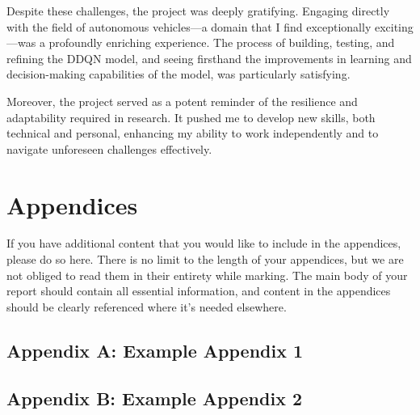 \documentclass{article}
\begin{document}
Despite these challenges, the project was deeply gratifying. Engaging directly with the field of autonomous vehicles—a domain that I find exceptionally exciting—was a profoundly enriching experience. The process of building, testing, and refining the DDQN model, and seeing firsthand the improvements in learning and decision-making capabilities of the model, was particularly satisfying.

Moreover, the project served as a potent reminder of the resilience and adaptability required in research. It pushed me to develop new skills, both technical and personal, enhancing my ability to work independently and to navigate unforeseen challenges effectively.

\small


\normalsize
\newpage
\section*{Appendices}
If you have additional content that you would like to include in the appendices, please do so here.
There is no limit to the length of your appendices, but we are not obliged to read them in their entirety while marking. The main body of your report should contain all essential information, and content in the appendices should be clearly referenced where it's needed elsewhere.
\subsection*{Appendix A: Example Appendix 1}
\subsection*{Appendix B: Example Appendix 2}
\end{document}

